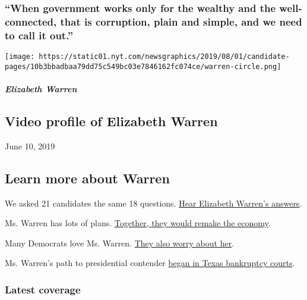 \hypertarget{when-government-works-only-for-the-wealthy-and-the-well-connected-that-is-corruption-plain-and-simple-and-we-need-to-call-it-out}{%
\subsubsection{``When government works only for the wealthy and the
well-connected, that is corruption, plain and simple, and we need to
call it
out.''}\label{when-government-works-only-for-the-wealthy-and-the-well-connected-that-is-corruption-plain-and-simple-and-we-need-to-call-it-out}}

\texttt{[image: https://static01.nyt.com/newsgraphics/2019/08/01/candidate-pages/10b3bbadbaa79dd75c549bc03e7846162fc074ce/warren-circle.png]}

\hypertarget{elizabeth-warren-1}{%
\subparagraph{Elizabeth Warren}\label{elizabeth-warren-1}}

\hypertarget{video-profile-of-elizabeth-warren}{%
\subsection{Video profile of Elizabeth
Warren}\label{video-profile-of-elizabeth-warren}}

June 10, 2019

\hypertarget{learn-more-about-warren}{%
\subsection{Learn more about Warren}\label{learn-more-about-warren}}

We asked 21 candidates the same 18 questions.
\href{https://www.nytimes.com/interactive/2019/us/politics/elizabeth-warren-2020-campaign.html}{Hear
Elizabeth Warren's answers}.

Ms. Warren has lots of plans.
\href{https://www.nytimes.com/2019/06/10/us/politics/elizabeth-warren-2020-policies-platform.html}{Together,
they would remake the economy}.

Many Democrats love Ms. Warren.
\href{http://nytimes.com/2019/08/15/us/politics/elizabeth-warren-2020-campaign.html}{They
also worry about her}.

Ms. Warren's path to presidential contender
\href{https://www.nytimes.com/2019/08/25/us/politics/elizabeth-warren-republican-history.html}{began
in Texas bankruptcy courts}.

\hypertarget{latest-coverage}{%
\subsubsection{Latest coverage}\label{latest-coverage}}

